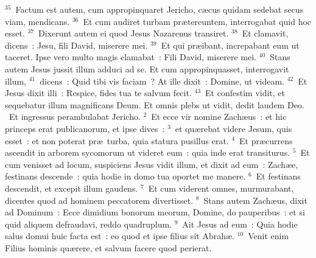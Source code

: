 ${}^{35}$~Factum est autem, cum appropinquaret Jericho, c\ae cus quidam sedebat secus viam, mendicans.
${}^{36}$~Et cum audiret turbam pr\ae tereuntem, interrogabat quid hoc esset.
${}^{37}$~Dixerunt autem ei quod Jesus Nazarenus transiret.
${}^{38}$~Et clamavit, dicens~: Jesu, fili David, miserere mei.
${}^{39}$~Et qui pr\ae ibant, increpabant eum ut taceret. Ipse vero multo magis clamabat~: Fili David, miserere mei.
${}^{40}$~Stans autem Jesus jussit illum adduci ad se. Et cum appropinquasset, interrogavit illum,
${}^{41}$~dicens~: Quid tibi vis faciam~? At ille dixit~: Domine, ut videam.
${}^{42}$~Et Jesus dixit illi~: Respice, fides tua te salvum fecit.
${}^{43}$~Et confestim vidit, et sequebatur illum magnificans Deum. Et omnis plebs ut vidit, dedit laudem Deo.
~Et ingressus perambulabat Jericho.
${}^{2}$~Et ecce vir nomine Zach\ae us~: et hic princeps erat publicanorum, et ipse dives~:
${}^{3}$~et qu\ae rebat videre Jesum, quis esset~: et non poterat pr\ae\ turba, quia statura pusillus erat.
${}^{4}$~Et pr\ae currens ascendit in arborem sycomorum ut videret eum~: quia inde erat transiturus.
${}^{5}$~Et cum venisset ad locum, suspiciens Jesus vidit illum, et dixit ad eum~: Zach\ae e, festinans descende~: quia hodie in domo tua oportet me manere.
${}^{6}$~Et festinans descendit, et excepit illum gaudens.
${}^{7}$~Et cum viderent omnes, murmurabant, dicentes quod ad hominem peccatorem divertisset.
${}^{8}$~Stans autem Zach\ae us, dixit ad Dominum~: Ecce dimidium bonorum meorum, Domine, do pauperibus~: et si quid aliquem defraudavi, reddo quadruplum.
${}^{9}$~Ait Jesus ad eum~: Quia hodie salus domui huic facta est~: eo quod et ipse filius sit Abrah\ae .
${}^{10}$~Venit enim Filius hominis qu\ae rere, et salvum facere quod perierat.


